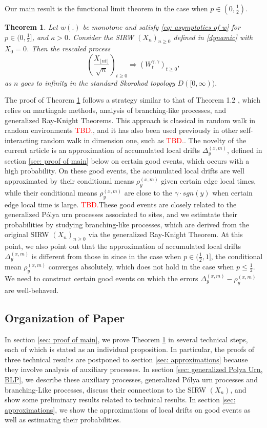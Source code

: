 \documentclass[twoside,12pt,a4paper]{article}
\newtheorem{theorem}{Theorem}[section]
\numberwithin{equation}{section}
\newcommand\TBD{\textcolor{red}{TBD.}}
\begin{document}
	Our main result is the functional limit theorem in the case when $p\in (0,\frac{1}{2})$.
	\begin{theorem}\label{thm: main}
		Let $w(.)$ be monotone and satisfy \eqref{eq: asymptotics of w} for $p\in (0,\frac{1}{2}]$, and $\kappa >0 $. Consider the SIRW $(X_n)_{n\geq 0}$ defined in \eqref{dynamic} with $X_0 =0$. Then the rescaled process
		$$
		\left(  \frac{X_{\lfloor nt \rfloor }}{\sqrt{n}}  \right)_{t\geq 0} \Longrightarrow \left( W^{\gamma,\gamma}_{t}\right)_{t\geq 0},
		$$ as $n$ goes to infinity in the standard Skorohod topology $D([0,\infty) ).$
	\end{theorem}
	The proof of Theorem \ref{thm: main} follows a strategy similar to that of Theorem 1.2 \cite{KMP22}, which relies on martingale methods, analysis of branching-like processes, and generalized Ray-Knight Theorems. This approach is classical in random walk in random environments \TBD, and it has also been used previously in other self-interacting random walk in dimension one, such as \TBD. The novelty of the current article is an approximation of accumulated local drifts $\Delta_y^{(x,m)}$, defined in section \ref{sec: proof of main} below on certain good events, which occurs with a high probability. On these good events, the accumulated local drifts are well approximated by their conditional means $\rho_{y}^{(x,m)}$ given certain edge local times, while their conditional means $\rho_{y}^{(x,m)}$ are close to the $\gamma \cdot sgn(y)$ when certain edge local time is large. \TBD These good events are closely related to the generalized P\'{o}lya  urn processes associated to sites, and we estimtate their probabilities by studying branching-like processes, which are derived from the original SIRW $(X_n)_{n\geq 0}$ via the generalized Ray-Knight Theorem. At this point, we also point out that the approximation of accumulated local drifts $\Delta_y^{(x,m)}$ is different from those in \cite{KMP22} since in the case when $p\in(\frac{1}{2},1]$, the conditional mean $\rho_{y}^{(x,m)}$ converges absolutely, which does not hold in the case when $p\leq \frac{1}{2}$. We need to construct certain good events on which the errors $\Delta_y^{(x,m)}- \rho_y^{(x,m)}$ are well-behaved.
	
	\subsection{Organization of Paper}
	In section \ref{sec: proof of main}, we prove Theorem \ref{thm: main} in several technical steps, each of which is stated as an individual proposition. In particular, the proofs of three technical results are postponed to section \ref{sec: approximations} because they involve analysis of auxiliary processes. In section \ref{sec: generalized Polya Urn, BLP}, we describe these auxiliary processes, generalized P\'{o}lya urn processes and branching-Like processes, discuss their connections to the SIRW $(X_n)$, and show some preliminary results related to technical results. In section \ref{sec: approximations}, we show the approximations of local drifts on good events as well as estimating their probabilities. 
	
\end{document}

